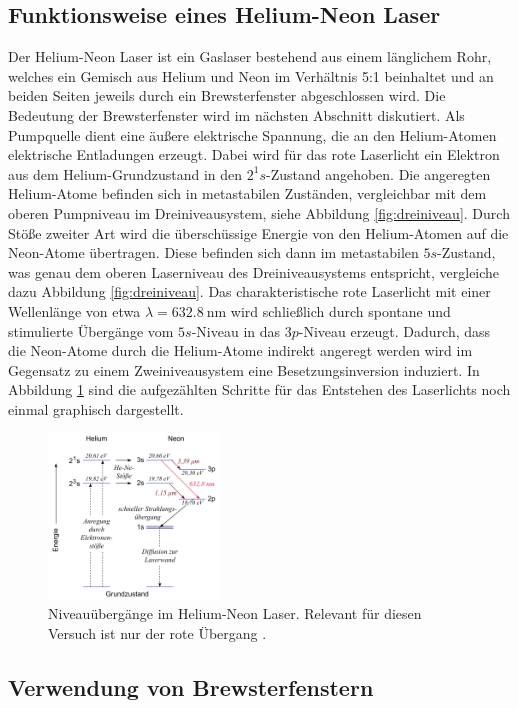 \subsection{Funktionsweise eines Helium-Neon Laser}

Der Helium-Neon Laser ist ein Gaslaser bestehend aus einem länglichem Rohr, welches ein Gemisch aus Helium und Neon
im Verhältnis 5:1 beinhaltet und an beiden Seiten jeweils durch ein Brewsterfenster abgeschlossen wird.
Die Bedeutung der Brewsterfenster wird im nächsten Abschnitt diskutiert. Als Pumpquelle dient eine äußere
elektrische Spannung, die an den Helium-Atomen elektrische Entladungen erzeugt. Dabei wird für das rote
Laserlicht ein Elektron aus dem Helium-Grundzustand in den $2^1 s$-Zustand angehoben. Die angeregten Helium-Atome
befinden sich in metastabilen Zuständen, vergleichbar mit dem oberen Pumpniveau im Dreiniveausystem, siehe Abbildung
\ref{fig:dreiniveau}. Durch Stöße zweiter Art wird die überschüssige Energie von den Helium-Atomen auf die
Neon-Atome übertragen. Diese befinden sich dann im metastabilen $5s$-Zustand, was genau dem oberen
Laserniveau des Dreiniveausystems entspricht, vergleiche dazu Abbildung \ref{fig:dreiniveau}.
Das charakteristische rote Laserlicht mit einer Wellenlänge von etwa $\lambda = \SI{632,8}{\nano\meter}$
wird schließlich durch spontane und stimulierte Übergänge vom $5s$-Niveau in das $3p$-Niveau erzeugt.
Dadurch, dass die Neon-Atome durch die Helium-Atome indirekt angeregt werden wird im Gegensatz zu einem
Zweiniveausystem eine Besetzungsinversion induziert. In Abbildung \ref{fig:HeNeÜbergänge} sind die
aufgezählten Schritte für das Entstehen des Laserlichts noch einmal graphisch dargestellt.

\begin{figure}[H]
  \centering
  \includegraphics[height = 4.4cm]{Pics von Buddy/heneübergänge.png}
  \caption{Niveauübergänge im Helium-Neon Laser. Relevant für diesen Versuch ist nur der rote Übergang \cite{goettingen}.}
  \label{fig:HeNeÜbergänge}
\end{figure}

\subsection{Verwendung von Brewsterfenstern}

